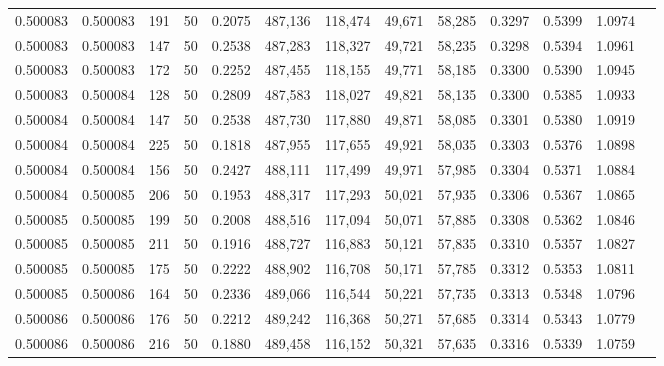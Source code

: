 \begin{tabular}{rrrrrrrrrrrrr}
0.500083 & 0.500083 &   191 &  50 &                                     0.2075 & 487,136 & 118,474 &  49,671 &  58,285 & 0.3297 & 0.5399 & 1.0974 \\
0.500083 & 0.500083 &   147 &  50 &                                     0.2538 & 487,283 & 118,327 &  49,721 &  58,235 & 0.3298 & 0.5394 & 1.0961 \\
0.500083 & 0.500083 &   172 &  50 &                                     0.2252 & 487,455 & 118,155 &  49,771 &  58,185 & 0.3300 & 0.5390 & 1.0945 \\
0.500083 & 0.500084 &   128 &  50 &                                     0.2809 & 487,583 & 118,027 &  49,821 &  58,135 & 0.3300 & 0.5385 & 1.0933 \\
0.500084 & 0.500084 &   147 &  50 &                                     0.2538 & 487,730 & 117,880 &  49,871 &  58,085 & 0.3301 & 0.5380 & 1.0919 \\
0.500084 & 0.500084 &   225 &  50 &                                     0.1818 & 487,955 & 117,655 &  49,921 &  58,035 & 0.3303 & 0.5376 & 1.0898 \\
0.500084 & 0.500084 &   156 &  50 &                                     0.2427 & 488,111 & 117,499 &  49,971 &  57,985 & 0.3304 & 0.5371 & 1.0884 \\
0.500084 & 0.500085 &   206 &  50 &                                     0.1953 & 488,317 & 117,293 &  50,021 &  57,935 & 0.3306 & 0.5367 & 1.0865 \\
0.500085 & 0.500085 &   199 &  50 &                                     0.2008 & 488,516 & 117,094 &  50,071 &  57,885 & 0.3308 & 0.5362 & 1.0846 \\
0.500085 & 0.500085 &   211 &  50 &                                     0.1916 & 488,727 & 116,883 &  50,121 &  57,835 & 0.3310 & 0.5357 & 1.0827 \\
0.500085 & 0.500085 &   175 &  50 &                                     0.2222 & 488,902 & 116,708 &  50,171 &  57,785 & 0.3312 & 0.5353 & 1.0811 \\
0.500085 & 0.500086 &   164 &  50 &                                     0.2336 & 489,066 & 116,544 &  50,221 &  57,735 & 0.3313 & 0.5348 & 1.0796 \\
0.500086 & 0.500086 &   176 &  50 &                                     0.2212 & 489,242 & 116,368 &  50,271 &  57,685 & 0.3314 & 0.5343 & 1.0779 \\
0.500086 & 0.500086 &   216 &  50 &                                     0.1880 & 489,458 & 116,152 &  50,321 &  57,635 & 0.3316 & 0.5339 & 1.0759 \\

\end{tabular}
